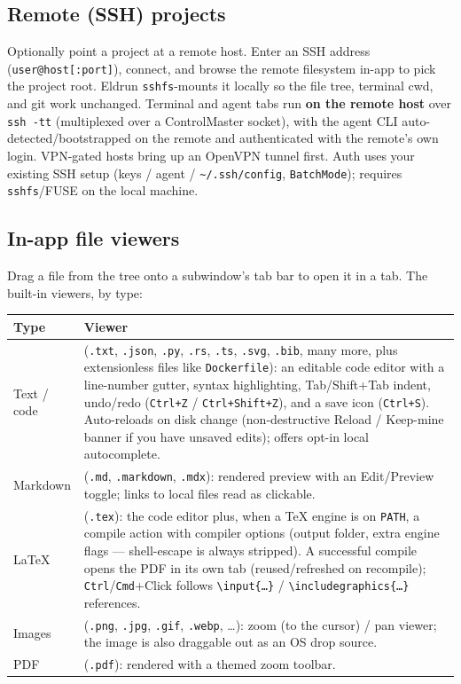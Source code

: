 \documentclass[11pt,a4paper]{article}
\newcommand{\code}[1]{\texttt{#1}}
\begin{document}
\subsection{Remote (SSH) projects}

Optionally point a project at a remote host. Enter an SSH address
(\code{user@host[:port]}), connect, and browse the remote filesystem in-app to
pick the project root. Eldrun \code{sshfs}-mounts it locally so the file tree,
terminal cwd, and git work unchanged. Terminal and agent tabs run \textbf{on the
remote host} over \code{ssh -tt} (multiplexed over a ControlMaster socket), with
the agent CLI auto-detected/bootstrapped on the remote and authenticated with
the remote's own login. VPN-gated hosts bring up an OpenVPN tunnel first. Auth
uses your existing SSH setup (keys / agent / \code{\textasciitilde/.ssh/config},
\code{BatchMode}); requires \code{sshfs}/FUSE on the local machine.

\subsection{In-app file viewers}

Drag a file from the tree onto a subwindow's tab bar to open it in a tab. The
built-in viewers, by type:

\begin{longtable}{@{}p{2.8cm}p{11.6cm}@{}}
\toprule
\textbf{Type} & \textbf{Viewer} \\
\midrule
\endhead
Text / code &
  (\code{.txt}, \code{.json}, \code{.py}, \code{.rs}, \code{.ts}, \code{.svg},
  \code{.bib}, many more, plus extensionless files like \code{Dockerfile}): an
  editable code editor with a line-number gutter, syntax highlighting,
  Tab/Shift+Tab indent, undo/redo (\code{Ctrl+Z} / \code{Ctrl+Shift+Z}), and a
  save icon (\code{Ctrl+S}). Auto-reloads on disk change (non-destructive
  Reload / Keep-mine banner if you have unsaved edits); offers opt-in local
  autocomplete. \\
\addlinespace
Markdown &
  (\code{.md}, \code{.markdown}, \code{.mdx}): rendered preview with an
  Edit/Preview toggle; links to local files read as clickable. \\
\addlinespace
LaTeX &
  (\code{.tex}): the code editor plus, when a TeX engine is on \code{PATH}, a
  compile action with compiler options (output folder, extra engine flags ---
  shell-escape is always stripped). A successful compile opens the PDF in its
  own tab (reused/refreshed on recompile); \code{Ctrl}/\code{Cmd}+Click follows
  \code{\textbackslash input\{\dots\}} /
  \code{\textbackslash includegraphics\{\dots\}} references. \\
\addlinespace
Images &
  (\code{.png}, \code{.jpg}, \code{.gif}, \code{.webp}, \dots): zoom (to the
  cursor) / pan viewer; the image is also draggable out as an OS drop source. \\
\addlinespace
PDF &
  (\code{.pdf}): rendered with a themed zoom toolbar. \\
\bottomrule
\end{longtable}
\end{document}
